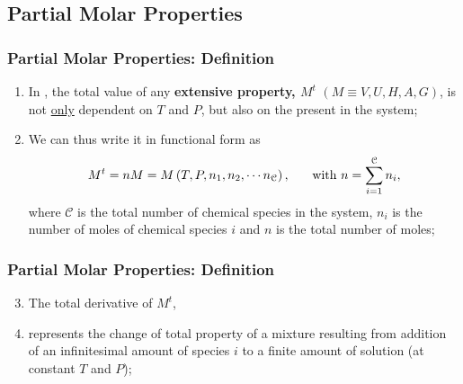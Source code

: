 \documentclass[10pt,compress,unknownkeysallowed]{beamer}
\begin{document}
\subsection{Partial Molar Properties}

\begin{frame}
  \frametitle{Partial Molar Properties: Definition}
  \begin{enumerate}%
    \item<1-> In , the total value of any {\bf extensive property, $M^{t}$} $\left(M\equiv V,U, H, A, G\right)$, is not \underline{only} dependent on $T$ and $P$, but also on the  present in the system;
    \item<2-> We can thus write it in functional form as
      \begin{displaymath}
        M^{t}=nM = M\left(T,P,n_{1}, n_{2}, \cdots n_{\mathcal{C}}\right), \hspace{.5cm} \text{ with } n = \summation[n_{i}]{i=1}{\mathcal{C}},
      \end{displaymath}
      where $\mathcal{C}$ is the total number of chemical species in the system, $n_{i}$ is the number of moles of chemical species $i$ and $n$ is the total number of moles;
  \end{enumerate} 
\end{frame}
\normalsize
\begin{frame}
  \frametitle{Partial Molar Properties: Definition}
  \begin{enumerate}\setcounter{enumi}{2}
    \item<1-> The total derivative of $M^{t}$,
    \item<3->  represents the change of total property  of a mixture resulting from addition of an infinitesimal amount of species $i$ to a finite amount of solution (at constant $T$ and $P$);
  \end{enumerate}
\end{frame}
\normalsize
\end{document}

